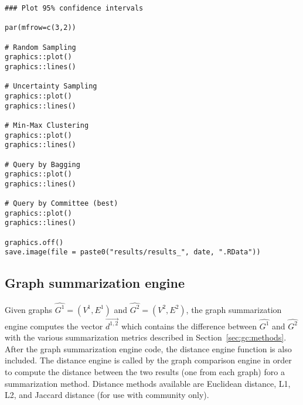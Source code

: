 {\begin{lstlisting}
### Plot 95% confidence intervals

par(mfrow=c(3,2))

# Random Sampling
graphics::plot()
graphics::lines()

# Uncertainty Sampling
graphics::plot()
graphics::lines()

# Min-Max Clustering
graphics::plot()
graphics::lines()

# Query by Bagging
graphics::plot()
graphics::lines()

# Query by Committee (best)
graphics::plot()
graphics::lines()

graphics.off()
save.image(file = paste0("results/results_", date, ".RData"))
\end{lstlisting}
}








\subsection{Graph summarization engine}
\label{sec:appendicies:gc:engine}

Given graphs $\hat{G^1}=(V^1,E^1)$ and $\hat{G^2}=(V^2,E^2)$, the graph 
summarization engine computes the vector $\overrightarrow{d^{1,2}}$ which 
contains the difference between $\hat{G^1}$ and $\hat{G^2}$ with the various 
summarization metrics described in Section~\ref{sec:gc:methods}. After the 
graph summarization engine code, the distance engine function is also included. 
The distance engine is called by the graph comparison engine in order to 
compute the distance between the two results (one from each graph) foro a 
summarization method. Distance methods available are Euclidean distance, L1, 
L2, and Jaccard distance (for use with community only).

